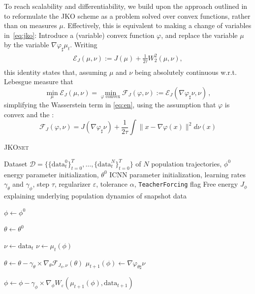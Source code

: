  To reach scalability and differentiability, we build upon the approach outlined in \citet{benamou2016discretization} to reformulate the \acrshort{JKO} scheme as a problem solved over convex functions, rather than on measures $\mu$. Effectively, this is equivalent to making a change of variables in~\eqref{eq:jko}: Introduce a (variable) convex function $\varphi$, and replace the variable $\mu$ by the variable $\nabla \varphi_{\sharp}\mu_t$. Writing
\begin{equation}\label{eq:en}
\begin{split}
\mathcal{E}_J(\mu, \nu) := J(\mu) +\frac{1}{2 \tau}W_2^2(\mu, \nu),\\
\end{split}
\end{equation}
this identity states that, assuming $\mu$ and $\nu$ being absolutely continuous w.r.t. Lebesgue measure that
$$\min_{\mu}\mathcal{E}_J(\mu,\nu) = \min_{\varphi \text{ convex}} \mathcal{F}_J(\varphi, \nu):= \mathcal{E}_J(\nabla \varphi_{\sharp}\nu, \nu)\,,$$
simplifying the Wasserstein term in \eqref{eq:en}, using the assumption that $\varphi$ is convex and the :
\begin{equation}\mathcal{F}_J(\varphi, \nu) = J(\nabla \varphi_{\sharp}\nu) +\frac{1}{2 \tau} \!\! \int\!\! \| x - \nabla \varphi(x) \|^2 d \nu(x)\label{eq:jko_psi}
\end{equation}

\begin{algorithm}[t]
\caption{\textsc{JKOnet}}
\label{algo:jkonet}
\begin{algorithmic}

    Dataset $\mathcal{D}=\{\{\mathrm{data}_t^0 \}_{t=0}^T, \ldots, \{\mathrm{data}_t^N \}_{t=0}^T\}$ of $N$ population trajectories, $\phi^0$ energy parameter initialization, $\theta^0$ ICNN parameter initialization, learning rates $\gamma_\theta$ and $\gamma_\phi$, step $\tau$, regularizer $\varepsilon$, tolerance $\alpha$, {\texttt{TeacherForcing}} flag
    Free energy $J_{\phi}$ explaining underlying population dynamics of snapshot data
   \smallskip
   
   \STATE $\phi\leftarrow \phi^0$

   \STATE $\theta\leftarrow \theta^0$

    \STATE $\nu \leftarrow \mathrm{data}_t$
   \ELSE
   \STATE $\nu \leftarrow \mu_t(\phi)$
   \ENDIF
    
   \STATE $\theta \leftarrow \theta - \gamma_\theta \times \nabla_\theta \mathcal{F}_{J_\phi,\nu}(\theta)$
   \ENDWHILE
   \STATE $\mu_{t+1}(\phi) \leftarrow \nabla \varphi_{\theta \sharp} \nu$

   \STATE $\phi \leftarrow \phi - \gamma_\phi \times \nabla_\phi W_\varepsilon(\mu_{t+1}(\phi), \mathrm{data}_{t+1})$
   \ENDFOR
   \ENDFOR
	
\end{algorithmic}
\end{algorithm}

